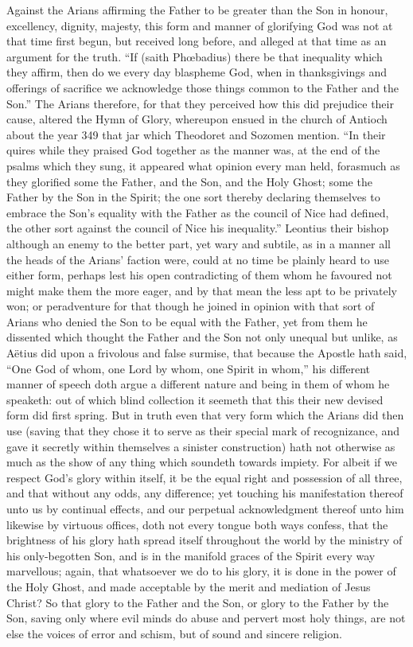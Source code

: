 Against the Arians affirming the Father to be greater than the Son in honour, excellency, dignity, majesty, this form and manner of glorifying God was not at that time first begun, but received long before, and alleged at that time as an argument for the truth. “If (saith Phœbadius) there be that inequality which they affirm, then do we every day blaspheme God, when in thanksgivings and offerings of sacrifice we acknowledge those things common to the Father and the Son.” The Arians therefore, for that they perceived how this did prejudice their cause, altered the Hymn of Glory, whereupon ensued in the church of Antioch about the year 349 that jar which Theodoret and Sozomen mention. “In their quires while they praised  God together as the manner was, at the end of the psalms which they sung, it appeared what opinion every man held, forasmuch as they glorified some the Father, and the Son, and the Holy Ghost; some the Father by the Son in the Spirit; the one sort thereby declaring themselves to embrace the Son’s equality with the Father as the council of Nice had defined, the other sort against the council of Nice his inequality.” Leontius their bishop although an enemy to the better part, yet wary and subtile, as in a manner all the heads of the Arians’ faction were, could at no time be plainly heard to use either form, perhaps lest his open contradicting of them whom he favoured not might make them the more eager, and by that mean the less apt to be privately won; or peradventure for that though he joined in opinion with that sort of Arians who denied the Son to be equal with the Father, yet from them he dissented which thought the Father and the Son not only unequal but unlike, as Aëtius did upon a frivolous and false surmise, that because the Apostle hath said, “One God of whom, one Lord by whom, one Spirit in whom,” his different manner of speech doth argue a different nature and being in them of whom he speaketh: out of which blind collection it seemeth that this their new devised form did first spring.
But in truth even that very form which the Arians did then use (saving that they chose it to serve as their special mark of recognizance, and gave it secretly within themselves a sinister construction) hath not otherwise as much as the show of any thing which soundeth towards impiety. For albeit if we respect God’s glory within itself, it be the equal right and possession of all three, and that without any odds, any difference; yet touching his manifestation thereof unto us by continual effects, and our perpetual acknowledgment  thereof unto him likewise by virtuous offices, doth not every tongue both ways confess, that the brightness of his glory hath spread itself throughout the world by the ministry of his only-begotten Son, and is in the manifold graces of the Spirit every way marvellous; again, that whatsoever we do to his glory, it is done in the power of the Holy Ghost, and made acceptable by the merit and mediation of Jesus Christ? So that glory to the Father and the Son, or glory to the Father by the Son, saving only where evil minds do abuse and pervert most holy things, are not else the voices of error and schism, but of sound and sincere religion.
